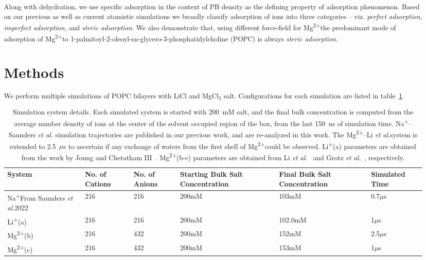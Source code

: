 \documentclass[12pt,openany,final]{book}
\newcommand{\etal}{\textit{et al.}}
\newcommand{\na}{Na\textsuperscript{+}}
\newcommand{\li}{Li\textsuperscript{+}}
\newcommand{\mg}{Mg\textsuperscript{2+}}
\newcommand{\nambnbfix}{Na\textsuperscript{+}--Saunders \etal}
\newcommand{\mgmbnbfix}{Mg\textsuperscript{2+}--Li \etal} %
\begin{document}
Along with dehydration, we use specific 
adsorption in the context of PB density 
as the defining property
of adsorption phenomenon. 
Based on our previous as well as current atomistic simulations we broadly
classify adsorption of ions into three categories -- viz. 
\emph{perfect adsorption}, \emph{imperfect adsorption},
and \emph{steric adsorption}. We also demonstrate that,
using different
force-field for \mg the predominant mode of adsorption
of \mg to 1-palmitoyl-2-oleoyl-sn-glycero-3-phosphatidylcholine (POPC) is 
{always} \emph{steric adsorption}.

\section{Methods}
We perform multiple simulations of POPC bilayers
with LiCl and MgCl$_{2}$ salt. Configurations for each simulation are listed in table~\ref{tab:ions:ch2}.
\begin{table}
    \caption[Simulation system details]{Simulation system details. Each simulated system is started with 200~mM salt, and the final bulk concentration 
    is computed from the average number density of ions 
    at the center of the solvent occupied region of the box, from the last 150~ns of simulation time. \nambnbfix
    simulation trajectories are published in our previous work, and are re-analyzed in this work. 
    The \mgmbnbfix system is extended to 2.5~$\mu$s to ascertain if any 
    exchange of waters from the first shell of \mg could be observed. \li (a) parameters are obtained from 
    the work by Joung and Chetatham III~\cite{joung:2008}. \mg (b-c) parameters
    are obtained from Li \etal~\cite{merzparams} and Grotz \etal~\cite{microparams}, respectively.}
    \label{tab:ions:ch2}
    \begin{minipage}{\textwidth}
    \tiny{
    \begin{tabularx}{\textwidth}{X|X|X|X|X|X}
        System & No. of Cations & No. of Anions & Starting Bulk Salt Concentration & Final Bulk Salt Concentration & Simulated Time \\\hline
        \na{\tiny{From Saunders \etal 2022~\cite{saunders:2022}}}      & 216  & 216   &   200mM   & 103mM & 0.7$\mu$s\\\hline
        \li (a)         & 216  & 216   &   200mM   & 102.0mM & 1$\mu$s  \\\hline
        \mg (b)         & 216  & 432   &   200mM   & 152mM  & 2.5$\mu$s\\\hline
        \mg (c)           & 216  & 432   &   200mM   & 153mM & 1$\mu$s\\\hline
    \end{tabularx}}\par
   \vspace{-0.75\skip\footins}
   \renewcommand{\footnoterule}{}
\end{minipage}
\end{table}
\end{document}
